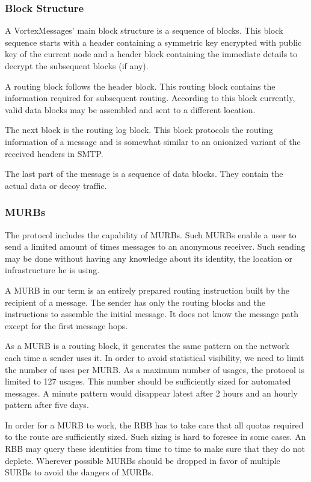 \subsubsection{Block Structure}
A VortexMessages' main block structure is a sequence of blocks. This block sequence starts with a header containing a symmetric key encrypted with public key of the current node and a header block containing the immediate details to decrypt the subsequent blocks (if any).

A routing block follows the header block. This routing block contains the information required for subsequent routing. According to this block currently, valid data blocks may be assembled and sent to a different location. 

The next block is the routing log block. This block protocols the routing information of a message and is somewhat similar to an onionized variant of the received headers in SMTP.

The last part of the message is a sequence of data blocks. They contain the actual data or decoy traffic.

\subsubsection{MURBs\label{sec:murb}}
The protocol includes the capability of MURBs. Such MURBs enable a user to send a limited amount of times messages to an anonymous receiver. Such sending may be done without having any knowledge about its identity, the location or infrastructure he is using.

A MURB in our term is an entirely prepared routing instruction built by the recipient of a message. The sender has only the routing blocks and the instructions to assemble the initial message. It does not know the message path except for the first message hops.

As a MURB is a routing block, it generates the same pattern on the network each time a sender uses it. In order to avoid statistical visibility, we need to limit the number of uses per MURB. As a maximum number of usages, the protocol is limited to 127 usages. This number should be sufficiently sized for automated messages. A minute pattern would disappear latest after 2 hours and an hourly pattern after five days.

In order for a MURB to work, the RBB has to take care that all quotas required to the route are sufficiently sized. Such sizing is hard to foresee in some cases. An RBB may query these identities from time to time to make sure that they do not deplete. Wherever possible MURBs should be dropped in favor of multiple SURBs to avoid the dangers of MURBs.

